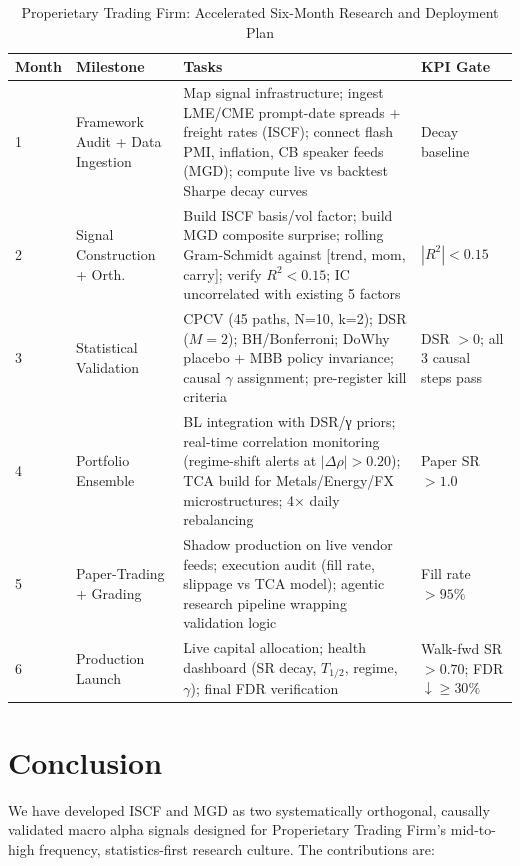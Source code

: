 \documentclass[12pt,a4paper]{article}
\begin{document}
\begin{table}[h]
\centering
\caption{Properietary Trading Firm: Accelerated Six-Month Research and Deployment Plan}
\small
\begin{tabular}{p{1.3cm}p{3.2cm}p{6.5cm}p{2.3cm}}
\toprule
Month & Milestone & Tasks & KPI Gate \\
\midrule
1 & Framework Audit + Data Ingestion
  & Map signal infrastructure; ingest LME/CME prompt-date spreads + freight rates (ISCF); connect flash PMI, inflation, CB speaker feeds (MGD); compute live vs backtest Sharpe decay curves
  & Decay baseline \\
2 & Signal Construction + Orth.
  & Build ISCF basis/vol factor; build MGD composite surprise; rolling Gram-Schmidt against [trend, mom, carry]; verify $R^2 < 0.15$; IC uncorrelated with existing 5 factors
  & $|R^2| < 0.15$ \\
3 & Statistical Validation
  & CPCV (45 paths, N=10, k=2); DSR ($M=2$); BH/Bonferroni; DoWhy placebo + MBB policy invariance; causal $\gamma$ assignment; pre-register kill criteria
  & DSR $> 0$; all 3 causal steps pass \\
4 & Portfolio Ensemble
  & BL integration with DSR/γ priors; real-time correlation monitoring (regime-shift alerts at $|\Delta\rho| > 0.20$); TCA build for Metals/Energy/FX microstructures; 4× daily rebalancing
  & Paper SR $> 1.0$ \\
5 & Paper-Trading + Grading
  & Shadow production on live vendor feeds; execution audit (fill rate, slippage vs TCA model); agentic research pipeline wrapping validation logic
  & Fill rate $> 95\%$ \\
6 & Production Launch
  & Live capital allocation; health dashboard (SR decay, $T_{1/2}$, regime, $\gamma$); final FDR verification
  & Walk-fwd SR $> 0.70$; FDR $\downarrow \geq 30\%$ \\
\bottomrule
\end{tabular}
\end{table}

\section{Conclusion}
\label{sec:conclusion}

We have developed ISCF and MGD as two systematically orthogonal, causally validated macro alpha signals designed for Properietary Trading Firm's mid-to-high frequency, statistics-first research culture. The contributions are:
\end{document}
